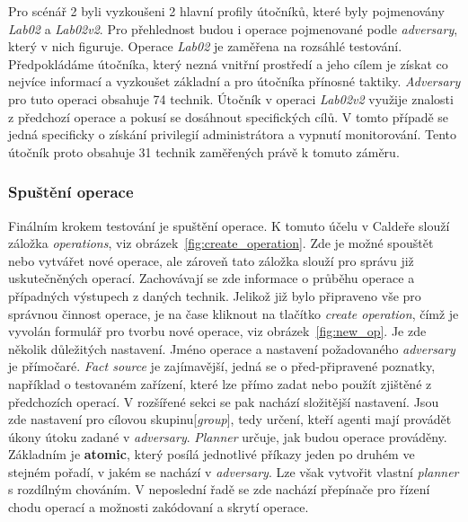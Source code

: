 Pro scénář 2 byli vyzkoušeni 2 hlavní profily útočníků, které byly pojmenovány \textit{Lab02} a \textit{Lab02v2}.
Pro přehlednost budou i operace pojmenované podle \textit{adversary}, který v nich figuruje.
Operace \textit{Lab02} je zaměřena na rozsáhlé testování.
Předpokládáme útočníka, který nezná vnitřní prostředí a jeho cílem je získat co nejvíce informací a vyzkoušet základní a pro útočníka přínosné taktiky.
\textit{Adversary} pro tuto operaci obsahuje 74 technik.
Útočník v operaci \textit{Lab02v2} využije znalosti z předchozí operace a pokusí se dosáhnout specifických cílů.
V tomto případě se jedná specificky o získání privilegií administrátora a vypnutí monitorování.
Tento útočník proto obsahuje 31 technik zaměřených právě k tomuto záměru.


\subsubsection{Spuštění operace}


Finálním krokem testování je spuštění operace.
K tomuto účelu v Caldeře slouží záložka \textit{operations}, viz obrázek~\ref{fig:create_operation}.
Zde je možné spouštět nebo vytvářet nové operace, ale zároveň tato záložka slouží pro správu již uskutečněných operací.
Zachovávají se zde informace o průběhu operace a případných výstupech z daných technik.
Jelikož již bylo připraveno vše pro správnou činnost operace, je na čase kliknout na tlačítko \textit{create operation}, čímž je vyvolán formulář pro tvorbu nové operace, viz obrázek~\ref{fig:new_op}.
Je zde několik důležitých nastavení.
Jméno operace a nastavení požadovaného \textit{adversary} je přímočaré.
\textit{Fact source} je zajímavější, jedná se o před-připravené poznatky, například o testovaném zařízení, které lze přímo zadat nebo použít zjištěné z předchozích operací.
V rozšířené sekci se pak nachází složitější nastavení.
Jsou zde nastavení pro cílovou skupinu[\textit{group}], tedy určení, kteří agenti mají provádět úkony útoku zadané v \textit{adversary}.
\textit{Planner} určuje, jak budou operace prováděny.
Základním je \textbf{atomic}, který posílá jednotlivé příkazy jeden po druhém ve stejném pořadí, v jakém se nachází v \textit{adversary}.
Lze však vytvořit vlastní \textit{planner} s rozdílným chováním\cite{mitre_caldera_docs}.
V neposlední řadě se zde nachází přepínače pro řízení chodu operací a možnosti zakódovaní a skrytí operace.

